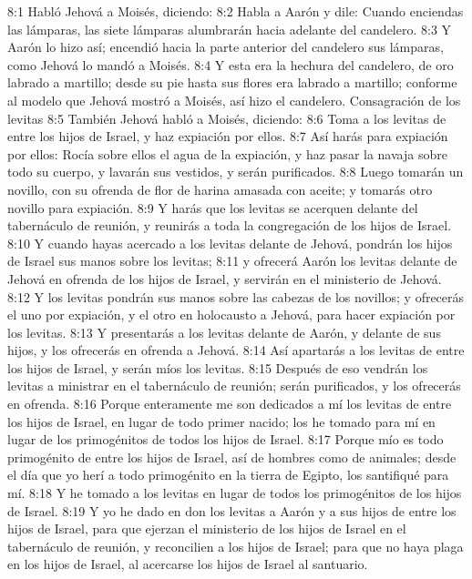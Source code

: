 8:1 Habló Jehová a Moisés, diciendo:  
8:2 Habla a Aarón y dile: Cuando enciendas las lámparas, las siete lámparas alumbrarán hacia adelante del candelero.  
8:3 Y Aarón lo hizo así; encendió hacia la parte anterior del candelero sus lámparas, como Jehová lo mandó a Moisés.  
8:4 Y esta era la hechura del candelero, de oro labrado a martillo; desde su pie hasta sus flores era labrado a martillo; conforme al modelo que Jehová mostró a Moisés, así hizo el candelero.  
Consagración de los levitas  
8:5 También Jehová habló a Moisés, diciendo:  
8:6 Toma a los levitas de entre los hijos de Israel, y haz expiación por ellos.  
8:7 Así harás para expiación por ellos: Rocía sobre ellos el agua de la expiación, y haz pasar la navaja sobre todo su cuerpo, y lavarán sus vestidos, y serán purificados.  
8:8 Luego tomarán un novillo, con su ofrenda de flor de harina amasada con aceite; y tomarás otro novillo para expiación.  
8:9 Y harás que los levitas se acerquen delante del tabernáculo de reunión, y reunirás a toda la congregación de los hijos de Israel.  
8:10 Y cuando hayas acercado a los levitas delante de Jehová, pondrán los hijos de Israel sus manos sobre los levitas;  
8:11 y ofrecerá Aarón los levitas delante de Jehová en ofrenda de los hijos de Israel, y servirán en el ministerio de Jehová.  
8:12 Y los levitas pondrán sus manos sobre las cabezas de los novillos; y ofrecerás el uno por expiación, y el otro en holocausto a Jehová, para hacer expiación por los levitas.  
8:13 Y presentarás a los levitas delante de Aarón, y delante de sus hijos, y los ofrecerás en ofrenda a Jehová.  
8:14 Así apartarás a los levitas de entre los hijos de Israel, y serán míos los levitas.  
8:15 Después de eso vendrán los levitas a ministrar en el tabernáculo de reunión; serán purificados, y los ofrecerás en ofrenda.  
8:16 Porque enteramente me son dedicados a mí los levitas de entre los hijos de Israel, en lugar de todo primer nacido; los he tomado para mí en lugar de los primogénitos de todos los hijos de Israel.  
8:17 Porque mío es todo primogénito de entre los hijos de Israel, así de hombres como de animales; desde el día que yo herí a todo primogénito en la tierra de Egipto, los santifiqué para mí.  
8:18 Y he tomado a los levitas en lugar de todos los primogénitos de los hijos de Israel.  
8:19 Y yo he dado en don los levitas a Aarón y a sus hijos de entre los hijos de Israel, para que ejerzan el ministerio de los hijos de Israel en el tabernáculo de reunión, y reconcilien a los hijos de Israel; para que no haya plaga en los hijos de Israel, al acercarse los hijos de Israel al santuario.  
